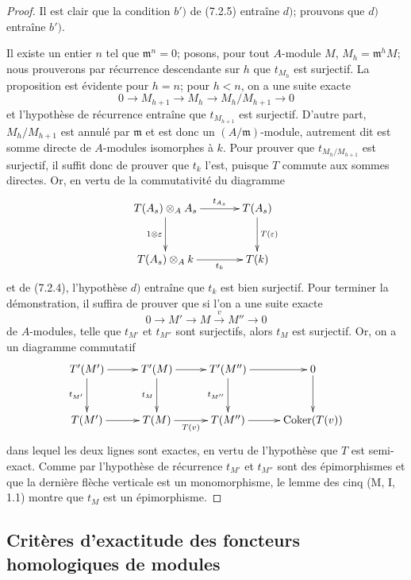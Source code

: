 \begin{proof}
Il est clair que la condition $b')$ de (7.2.5) entraîne $d)$; prouvons que
$d)$ entraîne $b')$.

Il existe un entier $n$ tel que $\mathfrak m^n=0$; posons, pour tout
$A$-module $M$, $M_h=\mathfrak m^hM$; nous prouverons par récurrence
descendante sur $h$ que $t_{M_h}$ est surjectif. La proposition est évidente
pour $h=n$; pour $h<n$, on a une suite exacte
\[
  0\longrightarrow M_{h+1}
  \longrightarrow M_h
  \longrightarrow M_h/M_{h+1}
  \longrightarrow 0
\]
et l'hypothèse de récurrence entraîne que $t_{M_{h+1}}$ est surjectif.
D'autre part, $M_h/M_{h+1}$ est annulé par $\mathfrak m$ et est donc un
$(A/\mathfrak m)$-module, autrement dit est somme directe de $A$-modules
isomorphes à $k$. Pour prouver que $t_{M_h/M_{h+1}}$ est surjectif, il suffit
donc de prouver que $t_k$ l'est, puisque $T$ commute aux sommes directes. Or,
en vertu de la commutativité du diagramme
\[
\xymatrix@C=35pt@R=30pt{
  T(A_s)\otimes_A A_s
  \ar[r]^-{t_{A_s}}\ar[d]_{1\otimes\varepsilon}
  &
  T(A_s)\ar[d]^{T(\varepsilon)}
  \\
  T(A_s)\otimes_A k
  \ar[r]_-{t_k}
  &
  T(k)
}
\]
et de (7.2.4), l'hypothèse $d)$ entraîne que $t_k$ est bien surjectif. Pour
terminer la démonstration, il suffira de prouver que si l'on a une suite
exacte
\[
  0\longrightarrow M'
  \longrightarrow M
  \xrightarrow{v}M''
  \longrightarrow 0
\]
de $A$-modules, telle que $t_{M'}$ et $t_{M''}$ sont surjectifs, alors $t_M$
est surjectif. Or, on a un diagramme commutatif
\[
\xymatrix@C=27pt@R=30pt{
  T'(M')\ar[r]\ar[d]_{t_{M'}}
  &
  T'(M)\ar[r]\ar[d]_{t_M}
  &
  T'(M'')\ar[r]\ar[d]_{t_{M''}}
  &
  0\ar[d]
  \\
  T(M')\ar[r]
  &
  T(M)\ar[r]_-{T(v)}
  &
  T(M'')\ar[r]
  &
  \operatorname{Coker}(T(v))
}
\]
dans lequel les deux lignes sont exactes, en vertu de l'hypothèse que $T$ est
semi-exact. Comme par l'hypothèse de récurrence $t_{M'}$ et $t_{M''}$ sont
des épimorphismes et que la dernière flèche verticale est un monomorphisme,
le lemme des cinq (M, I, 1.1) montre que $t_M$ est un épimorphisme.
\end{proof}

\subsection{Critères d'exactitude des foncteurs homologiques de modules}
\label{subsection:III.7.3.fr}

